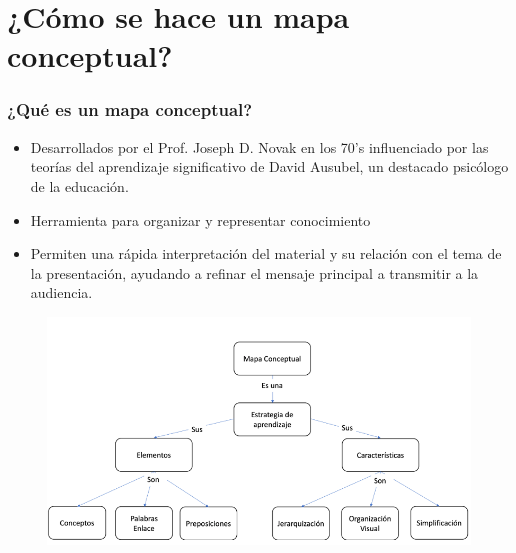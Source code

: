 \documentclass[
	11pt, %
]{beamer}
\begin{document}
\section{¿Cómo se hace un mapa conceptual?}
\begin{frame}
  \frametitle{¿Qué es un mapa conceptual?}

  \begin{itemize}
    \item Desarrollados por el Prof. Joseph D. Novak en los 70's influenciado por las teorías del aprendizaje significativo de David Ausubel, un destacado psicólogo de la educación.
    \item Herramienta para organizar y representar conocimiento
    \item Permiten una rápida interpretación del material y su relación con el tema de la presentación, ayudando a refinar el mensaje principal a transmitir a la audiencia.
  \end{itemize}

  \begin{figure}
    \includegraphics[width=0.7\linewidth]{mapa_conceptual.png}
  \end{figure}
  
\end{frame}
\end{document}
